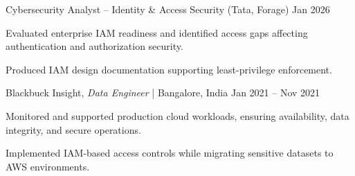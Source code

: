 \begin{cventries2}
 \cventry
   {Cybersecurity Analyst – Identity \& Access Security (Tata, Forage)}
   {Jan 2026}
   {
     \begin{cvitems}
       \item {Evaluated enterprise IAM readiness and identified access gaps affecting authentication and authorization security.}
       \item {Produced IAM design documentation supporting least-privilege enforcement.}
     \end{cvitems}
   }
   \vspace{3mm}

  \cventry
    {Blackbuck Insight, \textnormal{\textit{Data Engineer} | Bangalore, India}}
    {Jan 2021 -- Nov 2021}
    {
      \begin{cvitems}
        \item {Monitored and supported production cloud workloads, ensuring availability, data integrity, and secure operations.}
        \item {Implemented IAM-based access controls while migrating sensitive datasets to AWS environments.}
      \end{cvitems}
    }

\end{cventries2}
\vspace{4mm}